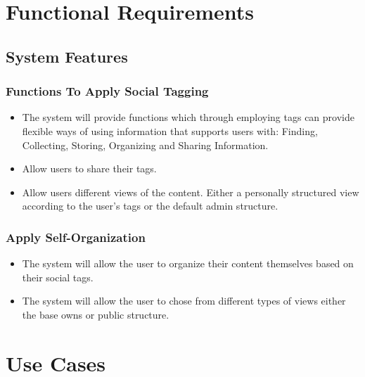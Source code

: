 \documentclass[12pt, oneside]{article}
\begin{document}
\section{Functional Requirements}

\subsection{System Features}

\subsubsection{Functions To Apply Social Tagging}
\begin{itemize}
\item The system will provide functions which through employing tags can provide flexible ways of using information that supports users with: Finding, Collecting, Storing, Organizing and Sharing Information.
\item Allow users to share their tags.
\item Allow users different views of the content. Either a personally structured view according to the user's tags or the default admin structure.
\end{itemize}

\subsubsection{Apply Self-Organization}
\begin{itemize}
\item The system will allow the user to organize their content themselves based on their social tags.
\item The system will allow the user to chose from different types of views either the base owns or public structure.
\end{itemize}

\section{Use Cases}
\end{document}
